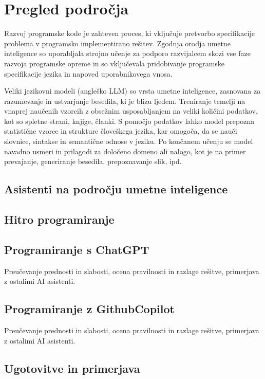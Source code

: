 \documentclass[12pt,a4paper]{book}
\begin{document}
\chapter{Pregled področja}
Razvoj programske kode je zahteven proces, ki vključuje pretvorbo specifikacije problema v programsko implementirano rešitev. Zgodnja orodja umetne inteligence so uporabljala strojno učenje za podporo razvijalcem skozi vse faze razvoja programske opreme in so vključevala pridobivanje programske specifikacije jezika in napoved uporabnikovega vnosa. \textcite{zhang2003machine}

Veliki jezikovni modeli (angleško LLM) so vrsta umetne inteligence, zasnovana za razumevanje in ustvarjanje besedila, ki je blizu ljedem. Treniranje temelji na vnaprej naučenih vzorcih z obsežnim usposabljanjem na veliki količini podatkov, kot so spletne strani, knjige, članki. S pomočjo podatkov lahko model prepozna statistične vzorce in strukture človeškega jezika, kar omogoča, da se nauči slovnice, sintakse in semantične odnose v jeziku. Po končanem učenju se model navadno usmeri in prilagodi za določeno domeno ali nalogo, kot je na primer prevajanje, generiranje besedila, prepoznavanje slik, ipd.
\section{Asistenti na področju umetne inteligence} 
 

\section{Hitro programiranje}

\section{Programiranje s ChatGPT}
Preučevanje prednosti in slabosti, ocena pravilnosti in razlage rešitve, primerjava z ostalimi  AI asistenti.

\section{Programiranje z GithubCopilot}
Preučevanje prednosti in slabosti, ocena pravilnosti in razlage rešitve, primerjava z ostalimi  AI asistenti.

\section{Ugotovitve in primerjava}
\end{document}

